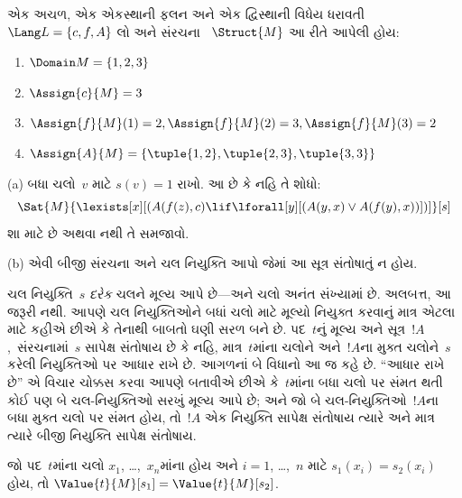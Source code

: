 \begin{prob}
એક અચળ, એક એકસ્થાની ફલન અને એક દ્વિસ્થાની
વિધેય ધરાવતી $\Lang L=\{c,f,A\}$ લો અને સંરચના
~$\Struct{M}$ આ રીતે આપેલી હોય:
\begin{enumerate}
\item $\Domain M = \{1, 2, 3\}$
\item $\Assign{c}{M} = 3$
\item $\Assign{f}{M}(1) = 2, \Assign{f}{M}(2) = 3, \Assign{f}{M}(3) = 2$
\item $\Assign{A}{M} = \{\tuple{1, 2}, \tuple{2, 3}, \tuple{3, 3}\}$
\end{enumerate}
(a) બધા ચલો~$v$ માટે $s(v)=1$ રાખો. આ છે કે નહિ તે શોધો:
\[
\Sat{M}{\lexists[x][(A(f(z), c) \lif \lforall[y][(A(y, x) \lor A(f(y),
      x))])]}[s]
\]
શા માટે છે અથવા નથી તે સમજાવો.

(b) એવી બીજી સંરચના અને ચલ નિયુક્તિ આપો જેમાં આ સૂત્ર
સંતોષાતું ન હોય.
\end{prob}
\endgroup


\begingroup
\makeatletter{}\makeatother


\label{guunit:OLP-0164}


\begin{explain}
ચલ નિયુક્તિ~$s$ \emph{દરેક} ચલને મૂલ્ય આપે છે---અને ચલો
અનંત સંખ્યામાં છે. અલબત્ત, આ જરૂરી નથી. આપણે ચલ
નિયુક્તિઓને બધાં ચલો માટે મૂલ્યો નિયુક્ત કરવાનું માત્ર એટલા
માટે કહીએ છીએ કે તેનાથી બાબતો ઘણી સરળ બને છે. પદ~$t$નું મૂલ્ય અને
સૂત્ર~$!A$,~સંરચનામાં~$s$ સાપેક્ષ સંતોષાય છે કે નહિ,
માત્ર~$t$માંના ચલોને અને~$!A$ના મુક્ત ચલોને~$s$
કરેલી નિયુક્તિઓ પર આધાર રાખે છે. આગળનાં બે વિધાનો આ જ કહે છે.
``આધાર રાખે છે'' એ વિચાર ચોક્કસ કરવા આપણે બતાવીએ છીએ કે~$t$માંના બધા
ચલો પર સંમત થતી કોઈ પણ બે ચલ-નિયુક્તિઓ સરખું મૂલ્ય આપે છે; અને જો બે
ચલ-નિયુક્તિઓ~$!A$ના બધા મુક્ત ચલો પર સંમત હોય, તો~$!A$ એક નિયુક્તિ
સાપેક્ષ સંતોષાય ત્યારે અને માત્ર ત્યારે બીજી નિયુક્તિ સાપેક્ષ સંતોષાય.
\end{explain}

\begin{prop}
જો પદ~$t$માંના ચલો $x_1$, \dots,~$x_n$માંના હોય અને
$i=1$, \dots,~$n$ માટે $s_1(x_i)=s_2(x_i)$ હોય, તો
$\Value{t}{M}[s_1]=\Value{t}{M}[s_2]$.
\end{prop}

